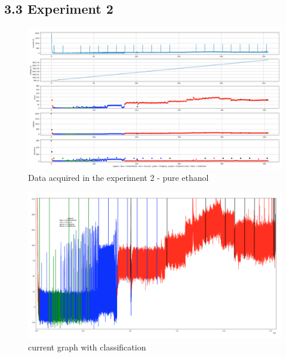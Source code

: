\subsection*{3.3 Experiment 2}

\begin{figure}[H]
    \center
    \includegraphics[width=18cm]{images/images_folder_3/data3.png}
    \caption{Data acquired in the experiment 2 - pure ethanol}
\end{figure}


\begin{figure}[H]
    \center
    \includegraphics[width=12cm]{images/images_folder_3/data3current.png}
    \caption{current graph with classification}
\end{figure}

